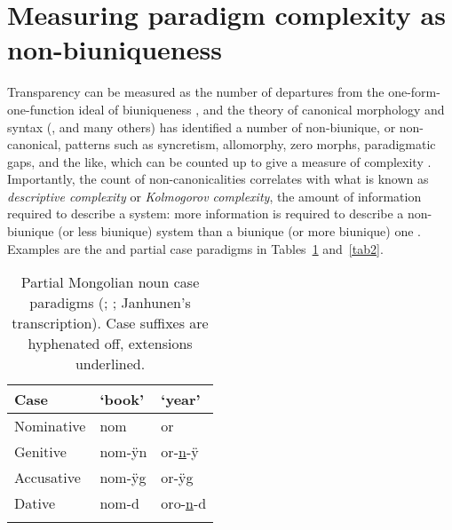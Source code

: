 \documentclass[output=paper,hidelinks]{langscibook}
\begin{document}
\section{Measuring paradigm complexity as non-biuniqueness}\label{sec:nichols:2}

Transparency can be measured as the number of departures from the one-form-one-function ideal of biuniqueness \citep{Nicholsa,Nicholsb}, and the theory of canonical morphology and syntax (\citealt{Corbett2016,Corbett2015,Corbett2013,Corbett2007,Bond2019}, and many others) has identified a number of non-biunique, or non-canonical, patterns such as syncretism, allomorphy, zero morphs, paradigmatic gaps, and the like, which can be counted up to give a measure of complexity \citep{Nichols2015,Nicholsb,Audring2017}.  Importantly, the count of non-canonicalities correlates with what is known as \textit{descriptive complexity} or \textit{Kolmogorov complexity}, the amount of information required to describe a system: more information is required  to describe a non-biunique (or less biunique) system than a biunique (or more biunique) one \citep[for types of complexity see][]{Dahl2004,MiestamoEtAl2008,Sinnemaeki2011}. Examples are the  and  partial case paradigms in Tables~\ref{tab1} and~\ref{tab2}.

\begin{table}
\caption{Partial Mongolian noun case paradigms (\citealt[163]{Svantesson2003}; \citealt[297--298, 106--112, 66--68]{Janhunen2012a}; Janhunen's transcription). Case suffixes are hyphenated off, extensions underlined.\label{tab1}}

\begin{tabularx}{\textwidth}{XXl}
\lsptoprule
Case 		 & ‘book’   & ‘year’ \\
 \midrule
Nominative	 & nom 		& or \\
Genitive 	 & nom-ÿn 	& or-\uline{n}-ÿ \\
Accusative   & nom-ÿg 	& or-ÿg \\
Dative       & nom-d 	& oro-\uline{n}-d \\
 \lspbottomrule
\end{tabularx}
\end{table}
\end{document}
